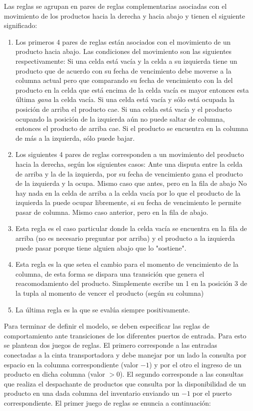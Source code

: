\documentclass[10pt]{article}
\begin{document}
Las reglas se agrupan en pares de reglas complementarias asociadas con el movimiento de los productos hacia la derecha y hacia abajo y tienen el siguiente significado:
\begin{enumerate}
	\item Los primeros 4 pares de reglas están asociados con el movimiento de un producto hacia abajo. Las condiciones del movimiento son las siguientes respectivamente:
	\subitem Si una celda está vacía y la celda a su izquierda tiene un producto que de acuerdo con su fecha de vencimiento debe moverse a la columna actual pero que comparando su fecha de vencimiento con la del producto en la celda que está encima de la celda vacía es mayor entonces esta última \textit{gana} la celda vacía.
	\subitem Si una celda está vacía y sólo está ocupada la posición de arriba el producto cae.
	\subitem Si una celda está vacía y el producto ocupando la posición de la izquierda aún no puede saltar de columna, entonces el producto de arriba cae.
	\subitem Si el producto se encuentra en la columna de más a la izquierda, sólo puede bajar.
	\item Los siguientes 4 pares de reglas corresponden a un movimiento del producto hacia la derecha, según los siguientes casos:
	\subitem Ante una disputa entre la celda de arriba y la de la izquierda, por su fecha de vencimiento gana el producto de la izquierda y la ocupa.
	\subitem Mismo caso que antes, pero en la fila de abajo
	\subitem No hay nada en la celda de arriba a la celda vacía por lo que el producto de la izquierda la puede ocupar libremente, si su fecha de vencimiento le permite pasar de columna.
	\subitem Mismo caso anterior, pero en la fila de abajo.
	\item Esta regla es el caso particular donde la celda vacía se encuentra en la fila de arriba (no es necesario preguntar por arriba) y el producto a la izquierda puede pasar porque tiene alguien abajo que lo "sostiene".
	\item Esta regla es la que setea el cambio para el momento de vencimiento de la columna, de esta forma se dispara una transición que genera el reacomodamiento del producto. Simplemente escribe un 1 en la posición 3 de la tupla al momento de vencer el producto (según su columna) 
	\item La última regla es la que se evalúa siempre positivamente.
\end{enumerate}

Para terminar de definir el modelo, se deben especificar las reglas de comportamiento ante transiciones de los diferentes puertos de entrada. Para esto se plantean dos juegos de reglas. El primero corresponde a las entradas conectadas a la cinta transportadora y debe manejar por un lado la consulta por espacio en la columna correspondiente (valor $-1$) y por el otro el ingreso de un producto en dicha columna (valor $>0$). El segundo corresponde a las consultas que realiza el despachante de productos que consulta por la disponibilidad de un producto en una dada columna del inventario enviando un $-1$ por el puerto correspondiente. El primer juego de reglas se enuncia a continuación:
\end{document}
